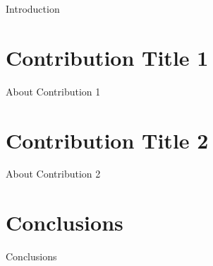 Introduction

\section{Contribution Title 1}

About Contribution 1

\section{Contribution Title 2}

About Contribution 2

\section{Conclusions}

Conclusions